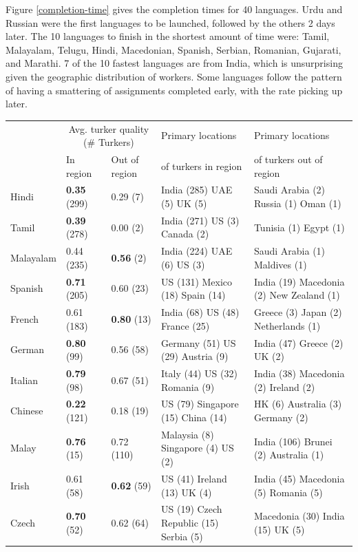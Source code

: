 \documentclass[11pt]{article}
\begin{document}
Figure \ref{completion-time} gives the completion times for 40 languages.  
Urdu and Russian were the first languages to be launched, followed by the others 2 days later. The 10 languages to finish in the shortest amount of time were: Tamil, Malayalam, Telugu, Hindi, Macedonian, Spanish, Serbian, Romanian, Gujarati, and Marathi. 7 of the 10 fastest languages are from India, which is unsurprising given the geographic distribution of workers.  Some languages follow the pattern of having a smattering of assignments completed early, with the rate picking up later. 


\begin{table}[h]
\footnotesize
\begin{tabular}{lllll}
\hline\hline
&\multicolumn{2}{c}{Avg. turker quality (\# Turkers)}&Primary locations&Primary locations\\
&In region&Out of region&of turkers in region&of turkers out of region\\
\hline\hline
Hindi&\textbf{0.35} (299)&0.29 (7)&India (285) UAE (5) UK (5) &Saudi Arabia (2) Russia (1) Oman (1) \\
Tamil&\textbf{0.39} (278)&0.00 (2)&India (271) US (3) Canada (2) &Tunisia (1) Egypt (1) \\
Malayalam&0.44 (235) &\textbf{0.56} (2)&India (224) UAE (6) US (3) &Saudi Arabia (1) Maldives (1) \\
Spanish&\textbf{0.71} (205)&0.60 (23)&US (131) Mexico (18) Spain (14) &India (19) Macedonia (2) New Zealand (1) \\
French&0.61 (183) &\textbf{0.80} (13)&India (68) US (48) France (25) &Greece (3) Japan (2) Netherlands (1) \\
German&\textbf{0.80} (99)&0.56 (58)&Germany (51) US (29) Austria (9) &India (47) Greece (2) UK (2) \\
Italian&\textbf{0.79} (98)&0.67 (51)&Italy (44) US (32) Romania (9) &India (38) Macedonia (2) Ireland (2) \\
Chinese&\textbf{0.22} (121)&0.18 (19)&US (79) Singapore (15) China (14) &HK (6) Australia (3) Germany (2) \\
Malay&\textbf{0.76} (15)&0.72 (110)&Malaysia (8) Singapore (4) US (2) &India (106) Brunei (2) Australia (1) \\
Irish&0.61 (58) &\textbf{0.62} (59)&US (41) Ireland (13) UK (4) &India (45) Macedonia (5) Romania (5) \\
Czech&\textbf{0.70} (52)&0.62 (64)&US (19) Czech Republic (15) Serbia (5) &Macedonia (30) India (15) UK (5) \\

\end{tabular}
\end{table}
\end{document}
